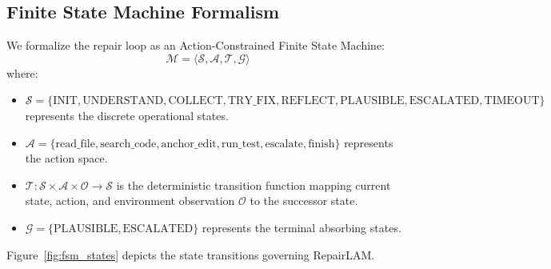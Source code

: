 \documentclass[12pt,a4paper]{report}
\begin{document}
\subsection{Finite State Machine Formalism}
We formalize the repair loop as an Action-Constrained Finite State Machine:
\begin{equation}
    \mathcal{M} = \langle \mathcal{S}, \mathcal{A}, \mathcal{T}, \mathcal{G} \rangle
\end{equation}
where:
\begin{itemize}
    \item $\mathcal{S} = \{ \text{INIT}, \text{UNDERSTAND}, \text{COLLECT}, \text{TRY\_FIX}, \text{REFLECT}, \text{PLAUSIBLE}, \text{ESCALATED}, \text{TIMEOUT} \}$ represents the discrete operational states.
    \item $\mathcal{A} = \{ \text{read\_file}, \text{search\_code}, \text{anchor\_edit}, \text{run\_test}, \text{escalate}, \text{finish} \}$ represents the action space.
    \item $\mathcal{T}: \mathcal{S} \times \mathcal{A} \times \mathcal{O} \to \mathcal{S}$ is the deterministic transition function mapping current state, action, and environment observation $\mathcal{O}$ to the successor state.
    \item $\mathcal{G} = \{ \text{PLAUSIBLE}, \text{ESCALATED} \}$ represents the terminal absorbing states.
\end{itemize}

Figure~\ref{fig:fsm_states} depicts the state transitions governing RepairLAM.
\end{document}
